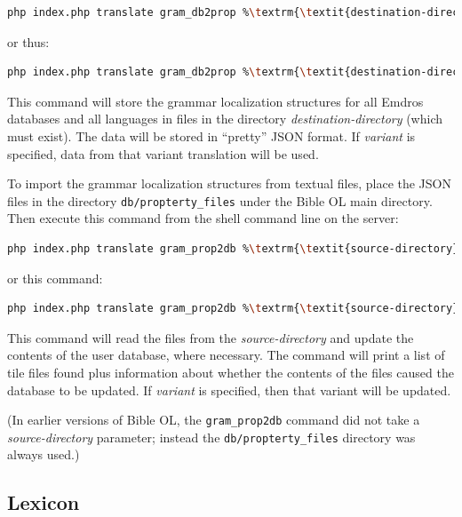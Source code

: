 \documentclass[11pt,oneside,a4paper]{memoir}
\begin{document}
\begin{lstlisting}[language=bash,basicstyle={\ttfamily}]
php index.php translate gram_db2prop %\textrm{\textit{destination-directory}}%
\end{lstlisting}

\noindent
or thus:

\begin{lstlisting}[language=bash,basicstyle={\ttfamily}]
php index.php translate gram_db2prop %\textrm{\textit{destination-directory}}% %\textrm{\textit{variant}}%
\end{lstlisting}

This command will store the grammar localization structures for all Emdros databases and all
languages in files in the directory \emph{destination-directory} (which must exist). The data will
be stored in ``pretty'' JSON format. If \emph{variant} is specified, data from that variant
translation will be used.

To import the grammar localization structures from textual files, place the JSON files in the directory
\texttt{db/propterty\_files} under the Bible OL main directory. Then execute this command from the
shell command line on the server:

\begin{lstlisting}[language=bash,basicstyle={\ttfamily}]
php index.php translate gram_prop2db %\textrm{\textit{source-directory}}%
\end{lstlisting}

\noindent
or this command:

\begin{lstlisting}[language=bash,basicstyle={\ttfamily}]
php index.php translate gram_prop2db %\textrm{\textit{source-directory}}% %\textrm{\textit{variant}}%
\end{lstlisting}

This command will read the files from the \emph{source-directory} and update the contents of the
user database, where necessary. The command will print a list of tile files found plus information
about whether the contents of the files caused the database to be updated. If \emph{variant} is
specified, then that variant will be updated.

(In earlier versions of Bible OL, the \texttt{gram\_prop2db} command did not take a
\emph{source-directory} parameter; instead the \texttt{db/propterty\_files} directory was always used.)

\subsection{Lexicon}\label{sec-lexicon}
\end{document}
